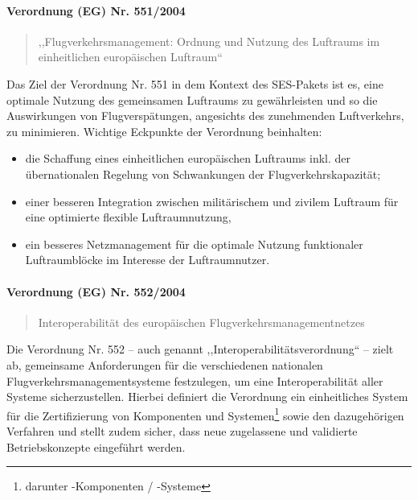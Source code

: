 \paragraph{Verordnung (EG) Nr. 551/2004} \label{er_551}
\begin{quote}
    ,,Flugverkehrsmanagement: Ordnung und Nutzung des Luftraums im einheitlichen europäischen Luftraum``
    \cite{2004R0551, 2004R0551_summary}
\end{quote}
Das Ziel der Verordnung Nr. 551 in dem Kontext des SES-Pakets ist es, eine optimale Nutzung des gemeinsamen Luftraums zu gewährleisten und so die Auswirkungen von Flugverspätungen, angesichts des zunehmenden Luftverkehrs, zu minimieren. 
Wichtige Eckpunkte der Verordnung beinhalten: 
    \begin{itemize}
        \item die Schaffung eines einheitlichen europäischen Luftraums inkl. der übernationalen Regelung von Schwankungen der Flugverkehrskapazität;
        \item  einer besseren Integration zwischen militärischem und zivilem Luftraum für eine optimierte flexible Luftraumnutzung,
        \item ein besseres Netzmanagement für die optimale Nutzung funktionaler Luftraumblöcke im Interesse der Luftraumnutzer. \cite{2004R0551_summary}
    \end{itemize}

\pagebreak

\paragraph{Verordnung (EG) Nr. 552/2004} \label{er_552}

\begin{quote}
    Interoperabilität des europäischen Flugverkehrsmanagement\-netzes
    \cite{2004R0552, 2004R0552_summary}
\end{quote}
Die Verordnung Nr. 552 -- auch genannt ,,Interoperabilitätsverordnung`` -- zielt ab, gemeinsame Anforderungen für die verschiedenen nationalen Flugverkehrsmanagementsysteme festzulegen, um eine Interoperabilität aller Systeme sicherzustellen. \cite{2004R0552_summary}
Hierbei definiert die Verordnung ein einheitliches System für die Zertifizierung von Komponenten und Systemen\footnote{darunter \atmans-Komponenten / -Systeme} sowie den dazugehörigen Verfahren und stellt zudem sicher, dass neue zugelassene und validierte Betriebskonzepte eingeführt werden. \cite[Art. 3 Abs. 1]{2004R0552}

